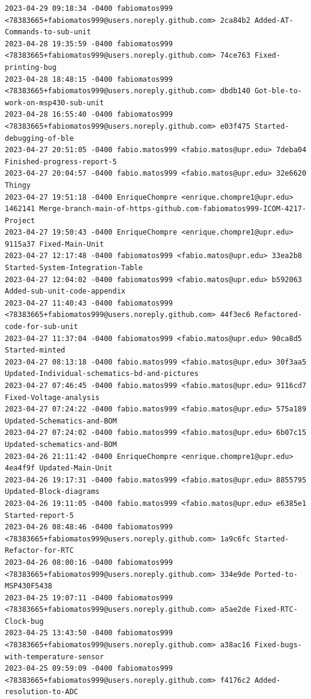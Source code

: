 \documentclass[12pt]{article}
\begin{document}
\begin{verbatim}
2023-04-29 09:18:34 -0400 fabiomatos999 <78383665+fabiomatos999@users.noreply.github.com> 2ca84b2 Added-AT-Commands-to-sub-unit
2023-04-28 19:35:59 -0400 fabiomatos999 <78383665+fabiomatos999@users.noreply.github.com> 74ce763 Fixed-printing-bug
2023-04-28 18:48:15 -0400 fabiomatos999 <78383665+fabiomatos999@users.noreply.github.com> dbdb140 Got-ble-to-work-on-msp430-sub-unit
2023-04-28 16:55:40 -0400 fabiomatos999 <78383665+fabiomatos999@users.noreply.github.com> e03f475 Started-debugging-of-ble
2023-04-27 20:51:05 -0400 fabio.matos999 <fabio.matos@upr.edu> 7deba04 Finished-progress-report-5
2023-04-27 20:04:57 -0400 fabio.matos999 <fabio.matos@upr.edu> 32e6620 Thingy
2023-04-27 19:51:18 -0400 EnriqueChompre <enrique.chompre1@upr.edu> 1462141 Merge-branch-main-of-https-github.com-fabiomatos999-ICOM-4217-Project
2023-04-27 19:50:43 -0400 EnriqueChompre <enrique.chompre1@upr.edu> 9115a37 Fixed-Main-Unit
2023-04-27 12:17:48 -0400 fabiomatos999 <fabio.matos@upr.edu> 33ea2b8 Started-System-Integration-Table
2023-04-27 12:04:02 -0400 fabiomatos999 <fabio.matos@upr.edu> b592063 Added-sub-unit-code-appendix
2023-04-27 11:40:43 -0400 fabiomatos999 <78383665+fabiomatos999@users.noreply.github.com> 44f3ec6 Refactored-code-for-sub-unit
2023-04-27 11:37:04 -0400 fabiomatos999 <fabio.matos@upr.edu> 90ca8d5 Started-minted
2023-04-27 08:13:18 -0400 fabio.matos999 <fabio.matos@upr.edu> 30f3aa5 Updated-Individual-schematics-bd-and-pictures
2023-04-27 07:46:45 -0400 fabio.matos999 <fabio.matos@upr.edu> 9116cd7 Fixed-Voltage-analysis
2023-04-27 07:24:22 -0400 fabio.matos999 <fabio.matos@upr.edu> 575a189 Updated-Schematics-and-BOM
2023-04-27 07:24:02 -0400 fabio.matos999 <fabio.matos@upr.edu> 6b07c15 Updated-schematics-and-BOM
2023-04-26 21:11:42 -0400 EnriqueChompre <enrique.chompre1@upr.edu> 4ea4f9f Updated-Main-Unit
2023-04-26 19:17:31 -0400 fabio.matos999 <fabio.matos@upr.edu> 8855795 Updated-Block-diagrams
2023-04-26 19:11:05 -0400 fabio.matos999 <fabio.matos@upr.edu> e6385e1 Started-report-5
2023-04-26 08:48:46 -0400 fabiomatos999 <78383665+fabiomatos999@users.noreply.github.com> 1a9c6fc Started-Refactor-for-RTC
2023-04-26 08:00:16 -0400 fabiomatos999 <78383665+fabiomatos999@users.noreply.github.com> 334e9de Ported-to-MSP430F5438
2023-04-25 19:07:11 -0400 fabiomatos999 <78383665+fabiomatos999@users.noreply.github.com> a5ae2de Fixed-RTC-Clock-bug
2023-04-25 13:43:50 -0400 fabiomatos999 <78383665+fabiomatos999@users.noreply.github.com> a38ac16 Fixed-bugs-with-temperature-sensor
2023-04-25 09:59:09 -0400 fabiomatos999 <78383665+fabiomatos999@users.noreply.github.com> f4176c2 Added-resolution-to-ADC

\end{verbatim}
\end{document}
